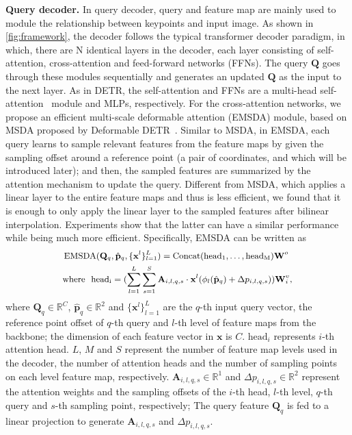 \documentclass[runningheads]{llncs}
\def\R{{\mathbb R}}
\def\Q{{\mathbf{Q}}}
\def\p{{\mathbf{p}}}
\def\x{{\mathbf{x}}}
\def\A{{\mathbf{A}}}
\def\W{{\mathbf{W}}}
\begin{document}
\noindent\textbf{Query decoder.} 
In query decoder, query and feature map are mainly used to module the relationship between keypoints and input image. As shown in \cref{fig:framework}, the decoder follows the typical transformer decoder paradigm, in which,
there are N identical layers in the decoder, each layer consisting of self-attention, cross-attention and feed-forward networks (FFNs). The query $\mathbf{Q}$ goes through these modules sequentially and generates an updated $\mathbf{Q}$ as the input to the next layer. As in DETR\cite{carion2020end}, the self-attention and FFNs are a multi-head self-attention~\cite{vaswani2017attention} module and MLPs, respectively. 
For the cross-attention networks, we propose an efficient multi-scale deformable attention (EMSDA) module, based on MSDA proposed by Deformable DETR~\cite{zhu2020deformable}. Similar to MSDA, in EMSDA, each query learns to sample relevant features from the feature maps by given the sampling offset around a reference point (a pair of coordinates, and which will be introduced later); and then, the sampled features are summarized by the attention mechanism to update the query. Different from MSDA, which applies a linear layer to the entire feature maps and thus is less efficient, we found that it is enough to only apply the linear layer to the sampled features after bilinear interpolation. Experiments show that the latter can have a similar performance while being much more efficient. Specifically, EMSDA can be written as 
\begin{equation}
\small
\begin{aligned}
    &\operatorname{EMSDA}(\Q_q,\hat{\p}_q,\{\x^l\}_{l=1}^L) = \operatorname{Concat}(\text{head}_{\mathrm{1}},\ldots,\text{head}_{\mathrm{M}})\W^o \\
    &\text{where}\ \ \text{head}_{\mathrm{i}} = (\sum\limits_{l=1}^{L}{\sum\limits_{s=1}^{S}{\A_{i,l,q,s} \cdot \x^l(\phi_l(\hat{\p}_q)+\Delta{p_{i,l,q,s}})}})\W^v_i , \\
\end{aligned}
\end{equation}
where $\Q_q \in \R^{C}$, $\hat{\p}_q \in \R^{2}$ and $\{\x^l\}_{l=1}^L$ are the $q$-th input query vector, the reference point offset of $q$-th query and $l$-th level of feature maps from the backbone; the dimension of each feature vector in $\x$ is $C$. $\text{head}_i$ represents $i$-th attention head. $L$, $M$ and $S$ represent the number of feature map levels used in the decoder, the number of attention heads and the number of sampling points on each level feature map, respectively. $\A_{i,l,q,s} \in \R^{1}$ and $\Delta{p_{i,l,q,s}} \in \R^{2}$ represent the attention weights and the sampling offsets of the $i$-th head, $l$-th level, $q$-th query and $s$-th sampling point, respectively; The query feature $\Q_q$ is fed to a linear projection to generate $\A_{i,l,q,s}$ and $\Delta{p_{i,l,q,s}}$.
\end{document}
